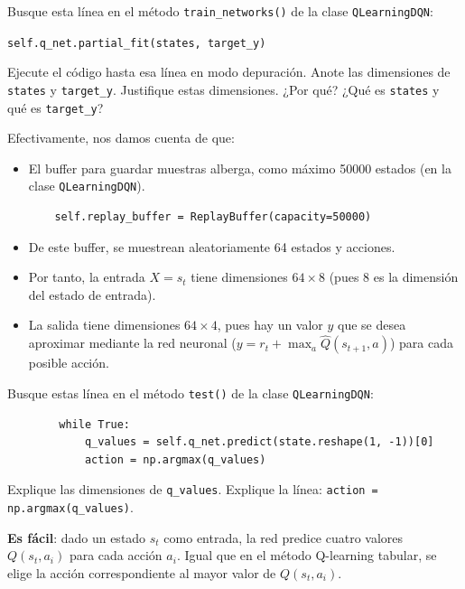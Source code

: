 \documentclass{article}
\begin{document}
\begin{exercise}
    Busque esta línea en el método \texttt{train\_networks()} de la clase     \texttt{QLearningDQN}:
    
    \texttt{self.q\_net.partial\_fit(states, target\_y)}
    
    Ejecute el código hasta esa línea en modo depuración. Anote las dimensiones de \texttt{states} y \texttt{target\_y}. Justifique estas dimensiones. ¿Por qué? ¿Qué es \texttt{states} y qué es \texttt{target\_y}?
\end{exercise}
Efectivamente, nos damos cuenta de que:
\begin{itemize}
    \item El buffer para guardar muestras alberga, como máximo 50000 estados (en la clase \texttt{QLearningDQN}).
    \begin{verbatim}
    self.replay_buffer = ReplayBuffer(capacity=50000)
    \end{verbatim}
    \item De este buffer, se muestrean aleatoriamente 64 estados y acciones.
    \item Por tanto, la entrada $X=s_t$ tiene dimensiones $64\times8$ (pues 8 es la dimensión del estado de entrada).
    \item La salida tiene dimensiones $64\times4$, pues hay un valor $y$ que se desea aproximar mediante la red neuronal ($y=r_t+\max_a{\hat{Q}(s_{t+1}, a)}$) para cada posible acción.
\end{itemize}

\begin{exercise}
    Busque estas línea en el método \texttt{test()} de la clase \texttt{QLearningDQN}:
    
    \begin{verbatim}
        while True:
            q_values = self.q_net.predict(state.reshape(1, -1))[0]
            action = np.argmax(q_values)
    \end{verbatim}
    Explique las dimensiones de \texttt{q\_values}. Explique la línea: \texttt{action = np.argmax(q\_values)}.
\end{exercise}
\textbf{Es fácil}: dado un estado $s_t$ como entrada, la red predice cuatro valores $Q(s_t, a_i)$ para cada acción $a_i$. Igual que en el método Q-learning tabular, se elige la acción correspondiente al mayor valor de $Q(s_t, a_i)$. 
\end{document}
